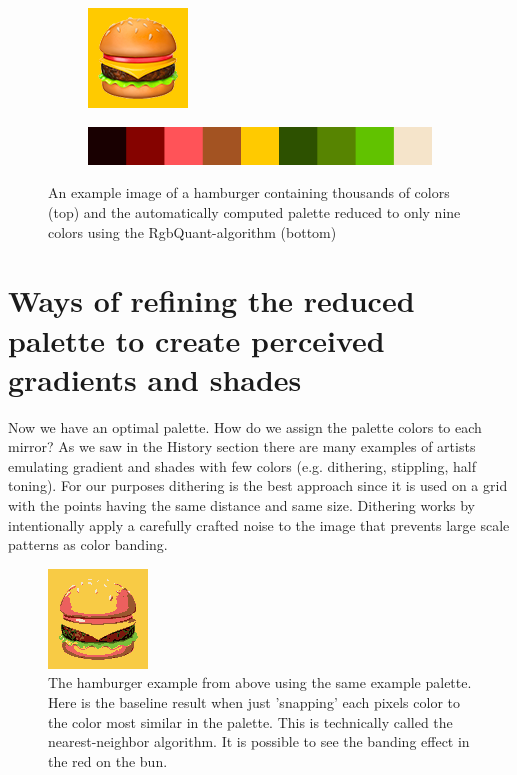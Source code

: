 \documentclass{article}
\begin{document}
\begin{figure}[ht!]
\centering

    \begin{subfigure}{0.5\textwidth}
         \centering
         \includegraphics[scale=1.0]{images/walkthrough/start.png}
     \end{subfigure}
     
     \begin{subfigure}{0.5\textwidth}
         \centering
         \includegraphics[scale=1.0]{images/walkthrough/palette.png}
     \end{subfigure}

\caption{An example image of a hamburger containing thousands of colors (top) and the automatically computed palette reduced to only nine colors using the RgbQuant-algorithm (bottom)}
\end{figure}





\section{Ways of refining the reduced palette to create perceived gradients and shades}

Now we have an optimal palette. How do we assign the palette colors to each mirror?
As we saw in the History section there are many examples of artists
emulating gradient and shades with few colors (e.g. dithering,
stippling, half toning). For our purposes dithering is the best approach
since it is used on a grid with the points having the same distance and
same size. Dithering works by intentionally apply a carefully crafted
noise to the image that prevents large scale patterns as color banding.

\begin{figure}[ht!]
\centering
\includegraphics{images/walkthrough/threshold.png}
\caption{The hamburger example from above using the same example palette. Here is the baseline result when just 'snapping' each pixels color to the color most similar in the palette. This is technically called the nearest-neighbor algorithm. It is possible to see the banding effect in the red on the bun.}
\end{figure}
\end{document}

